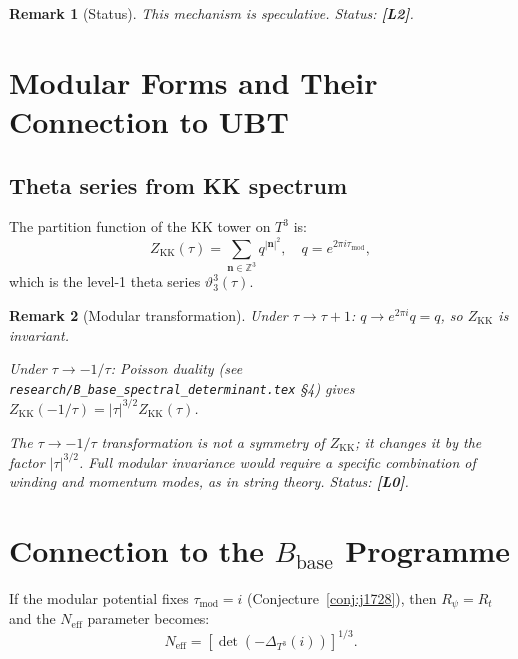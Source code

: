 \documentclass[11pt,a4paper]{article}
\newtheorem{remark}{Remark}
\begin{document}
\begin{remark}[Status]
  This mechanism is speculative.  Status: \textbf{[L2]}.
\end{remark}

\section{Modular Forms and Their Connection to UBT}
\label{sec:mf}

\subsection{Theta series from KK spectrum}

The partition function of the KK tower on $T^3$ is:
\begin{equation}
\label{eq:kk_partition}
  Z_{\mathrm{KK}}(\tau)
  = \sum_{\mathbf{n}\in\mathbb{Z}^3}
    q^{|\mathbf{n}|^2},
  \quad q = e^{2\pi i\tau_{\mathrm{mod}}},
\end{equation}
which is the level-1 theta series $\vartheta_3^3(\tau)$.

\begin{remark}[Modular transformation]
  Under $\tau \to \tau + 1$: $q \to e^{2\pi i}q = q$, so
  $Z_{\mathrm{KK}}$ is invariant.
  
  Under $\tau \to -1/\tau$: Poisson duality (see
  \texttt{research/B\_base\_spectral\_determinant.tex} §4) gives
  $Z_{\mathrm{KK}}(-1/\tau) = |\tau|^{3/2} Z_{\mathrm{KK}}(\tau)$.

  The $\tau \to -1/\tau$ transformation is \emph{not} a symmetry of
  $Z_{\mathrm{KK}}$; it changes it by the factor $|\tau|^{3/2}$.
  Full modular invariance would require a specific combination of
  winding and momentum modes, as in string theory.
  Status: \textbf{[L0]}.
\end{remark}

\section{Connection to the \texorpdfstring{$B_{\mathrm{base}}$}{B\_base} Programme}
\label{sec:bbase}

If the modular potential fixes $\tau_{\mathrm{mod}} = i$ (Conjecture~\ref{conj:j1728}),
then $R_\psi = R_t$ and the $N_{\mathrm{eff}}$ parameter becomes:
\begin{equation}
  N_{\mathrm{eff}} = [\det(-\Delta_{T^3}(i))]^{1/3}.
\end{equation}
\end{document}
